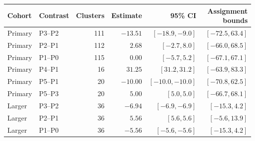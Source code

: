 \begin{tabular}{@{}llrrrr@{}}\toprule
Cohort & Contrast & Clusters & Estimate & 95\% CI & Assignment bounds\\\midrule
Primary & P3--P2 & 111 & $-13.51$ & $[-18.9,-9.0]$ & $[-72.5,63.4]$\\
Primary & P2--P1 & 112 & $2.68$ & $[-2.7,8.0]$ & $[-66.0,68.5]$\\
Primary & P1--P0 & 115 & $0.00$ & $[-5.7,5.2]$ & $[-67.1,67.1]$\\
Primary & P4--P1 & 16 & $31.25$ & $[31.2,31.2]$ & $[-63.9,83.3]$\\
Primary & P5--P1 & 20 & $-10.00$ & $[-10.0,-10.0]$ & $[-70.8,62.5]$\\
Primary & P5--P3 & 20 & $5.00$ & $[5.0,5.0]$ & $[-66.7,68.1]$\\
Larger & P3--P2 & 36 & $-6.94$ & $[-6.9,-6.9]$ & $[-15.3,4.2]$\\
Larger & P2--P1 & 36 & $5.56$ & $[5.6,5.6]$ & $[-5.6,13.9]$\\
Larger & P1--P0 & 36 & $-5.56$ & $[-5.6,-5.6]$ & $[-15.3,4.2]$\\
\bottomrule
\end{tabular}
